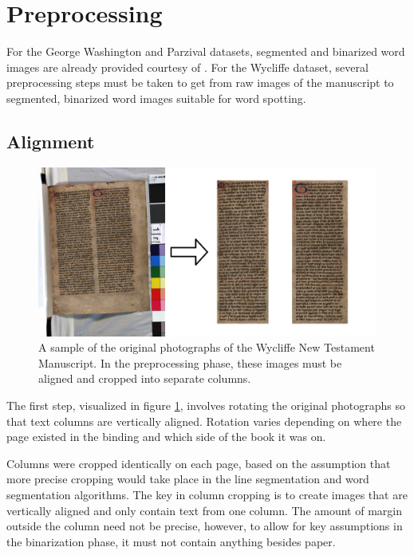 \documentclass[final]{ukthesis}
\begin{document}
%
%
\section{Preprocessing}
For the George Washington and Parzival datasets, segmented and binarized word images are already provided courtesy of \cite{fischer2012lexicon}. For the Wycliffe dataset, several preprocessing steps must be taken to get from raw images of the manuscript to segmented, binarized word images suitable for word spotting.


\subsection{Alignment}

\begin{figure}[t]
\begin{center}
\includegraphics[width=12cm]{rotate-crop}
\end{center}
\caption{A sample of the original photographs of the Wycliffe New Testament Manuscript. In the preprocessing phase, these images must be aligned and cropped into separate columns.}
\label{fig:rotate-crop}
\end{figure}
The first step, visualized in figure \ref{fig:rotate-crop}, involves rotating the original photographs so that text columns are vertically aligned. Rotation varies depending on where the page existed in the binding and which side of the book it was on.

Columns were cropped identically on each page, based on the assumption that more precise cropping would take place in the line segmentation and word segmentation algorithms. The key in column cropping is to create images that are vertically aligned and only contain text from one column. The amount of margin outside the column need not be precise, however, to allow for key assumptions in the binarization phase, it must not contain anything besides paper.
\end{document}
